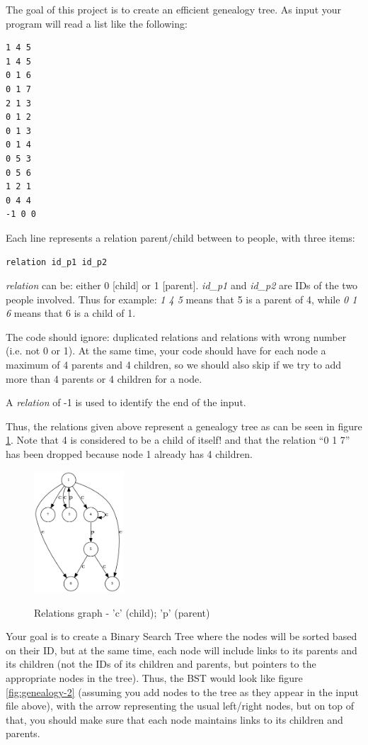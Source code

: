 The goal of this project is to create an efficient genealogy tree. As input your
program will read a list like the following:

\begin{verbatim}
1 4 5
1 4 5
0 1 6
0 1 7
2 1 3
0 1 2
0 1 3
0 1 4
0 5 3
0 5 6
1 2 1
0 4 4
-1 0 0
\end{verbatim}

Each line represents a relation parent/child between to people, with three items:

\begin{verbatim}
relation id_p1 id_p2
\end{verbatim}

\textit{relation} can be: either 0 [child] or 1 [parent]. \textit{id\_p1}
and \textit{id\_p2} are IDs of the two people involved. Thus for
example: \textit{1 4 5} means that 5 is a parent of 4, while \textit{0 1 6} means
that 6 is a child of 1.

The code should ignore: duplicated relations and relations with wrong number
(i.e. not 0 or 1). At the same time, your code should have for each node a
maximum of 4 parents and 4 children, so we should also skip if we try to add
more than 4 parents or 4 children for a node.

A \textit{relation} of -1 is used to identify the end of the input.

Thus, the relations given above represent a genealogy tree as can be seen in
figure \ref{fig:genealogy-1}. Note that 4 is considered to be a child of itself!
and that the relation ``0 1 7'' has been dropped because node 1 already has 4
children.

\begin{figure}[!htbp]
  \centering
  \includegraphics[width=0.3\textwidth]{graphics/projects/gen1.png}
  \label{fig:genealogy-1}
  \caption{Relations graph - 'c' (child); 'p' (parent)}
\end{figure}


Your goal is to create a Binary Search Tree where the nodes will be sorted based
on their ID, but at the same time, each node will include links to its parents
and its children (not the IDs of its children and parents, but pointers to the
appropriate nodes in the tree). Thus, the BST would look like
figure \ref{fig:genealogy-2} (assuming you add nodes to the tree as they appear
in the input file above), with the arrow representing the usual left/right
nodes, but on top of that, you should make sure that each node maintains links
to its children and parents.

